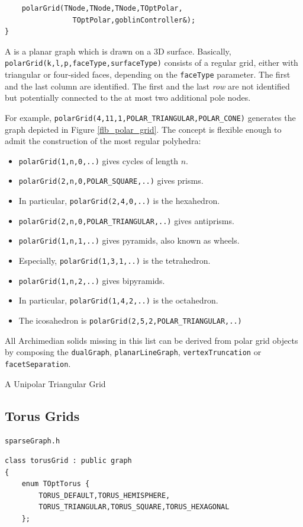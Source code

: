 \documentclass[a4paper,11pt,twoside]{book}
\begin{document}
\begin{multicols}{2}
\begin{mymethods}
\begin{verbatim}
    polarGrid(TNode,TNode,TNode,TOptPolar,
                TOptPolar,goblinController&);
}
\end{verbatim}
\end{mymethods}
A  is a planar graph which is drawn on a 3D surface. Basically,
\verb/polarGrid(k,l,p,faceType,surfaceType)/ consists of a regular grid, either
with triangular or four-sided faces, depending on the \verb/faceType/ parameter.
The first and the last column are identified. The first and the last {\it row}
are not identified but potentially connected to the at most two additional pole
nodes.

For example, \verb/polarGrid(4,11,1,POLAR_TRIANGULAR,POLAR_CONE)/ generates the
graph depicted in Figure \ref{flb_polar_grid}. The concept is flexible enough to
admit the construction of the most regular polyhedra:
\begin{itemize}
\item \verb/polarGrid(1,n,0,..)/ gives cycles of length $n$.
\item \verb/polarGrid(2,n,0,POLAR_SQUARE,..)/ gives prisms.
\item In particular, \verb/polarGrid(2,4,0,..)/ is the hexahedron.
\item \verb/polarGrid(2,n,0,POLAR_TRIANGULAR,..)/ gives antiprisms.
\item \verb/polarGrid(1,n,1,..)/ gives pyramids, also known as wheels.
\item Especially, \verb/polarGrid(1,3,1,..)/ is the tetrahedron.
\item \verb/polarGrid(1,n,2,..)/ gives bipyramids.
\item In particular, \verb/polarGrid(1,4,2,..)/ is the octahedron.
\item The icosahedron is \verb/polarGrid(2,5,2,POLAR_TRIANGULAR,..)/
\end{itemize}
All Archimedian solids missing in this list can be derived from polar grid objects
by composing the \verb/dualGraph/, \verb/planarLineGraph/, \verb/vertexTruncation/
or \verb/facetSeparation/.

\bigskip
\begin{figurehere}
\begin{center}
\epsfxsize=8cm
\vspace{0.5cm}
\caption{\label{flb_polar_grid}A Unipolar Triangular Grid}
\end{center}
\end{figurehere}


\subsection{Torus Grids}
\label{slb_torus_grid}
\myinclude\verb/sparseGraph.h/
\begin{mymethods}
\begin{verbatim}
class torusGrid : public graph
{
    enum TOptTorus {
        TORUS_DEFAULT,TORUS_HEMISPHERE,
        TORUS_TRIANGULAR,TORUS_SQUARE,TORUS_HEXAGONAL
    };


\end{verbatim}
\end{mymethods}
\end{multicols}
\end{document}

